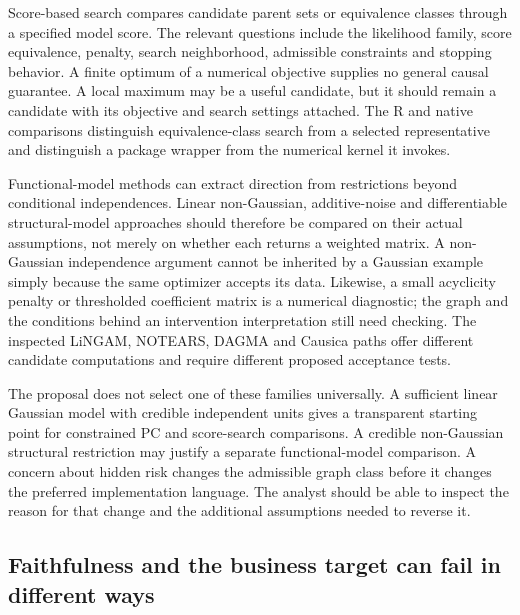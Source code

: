 Score-based search compares candidate parent sets or equivalence classes
through a specified model score. The relevant questions include the likelihood
family, score equivalence, penalty, search neighborhood, admissible constraints
and stopping behavior. A finite optimum of a numerical objective supplies no
general causal guarantee. A local maximum may be a useful candidate, but it
should remain a candidate with its objective and search settings attached.
The R and native comparisons distinguish equivalence-class search from a
selected representative and distinguish a package wrapper from the numerical
kernel it invokes. \citep{exec13_pcalg,exec13_cxx_xges,exec16_ct_pcalg}

Functional-model methods can extract direction from restrictions beyond
conditional independences. Linear non-Gaussian, additive-noise and differentiable
structural-model approaches should therefore be compared on their actual
assumptions, not merely on whether each returns a weighted matrix. A
non-Gaussian independence argument cannot be inherited by a Gaussian example
simply because the same optimizer accepts its data. Likewise, a small
acyclicity penalty or thresholded coefficient matrix is a numerical diagnostic;
the graph and the conditions behind an intervention interpretation still need
checking. The inspected LiNGAM, NOTEARS, DAGMA and Causica paths offer
different candidate computations and require different proposed acceptance
tests. \citep{exec13_pydisc_lingam,exec13_pydisc_notears,exec13_pydisc_dagma,exec13_pydisc_causica}

The proposal does not select one of these families universally. A sufficient
linear Gaussian model with credible independent units gives a transparent
starting point for constrained PC and score-search comparisons. A credible
non-Gaussian structural restriction may justify a separate functional-model
comparison. A concern about hidden risk changes the admissible graph class
before it changes the preferred implementation language. The analyst should
be able to inspect the reason for that change and the additional assumptions
needed to reverse it.

\subsection{Faithfulness and the business target can fail in different ways}

